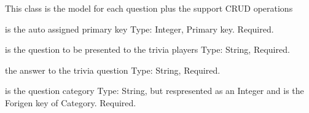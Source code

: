 \documentclass[letterpaper,10pt,english]{sphinxmanual}
\begin{document}
\begin{fulllineitems}
\label{\detokenize{index:models.Question}}
This class is the model for each question plus the support CRUD operations

\begin{fulllineitems}
\label{\detokenize{index:models.Question.id}}
 is the auto assigned primary key
Type: Integer, Primary key. Required.

\end{fulllineitems}


\begin{fulllineitems}
\label{\detokenize{index:models.Question.question}}
 is the question to be presented to the trivia players
Type: String, Required.

\end{fulllineitems}


\begin{fulllineitems}
\label{\detokenize{index:models.Question.answer}}
 the answer to the trivia question
Type: String, Required.

\end{fulllineitems}


\begin{fulllineitems}
\label{\detokenize{index:models.Question.category}}
 is the question category
Type: String, but respresented as an Integer and is the Forigen key of Category. Required.

\end{fulllineitems}


\end{fulllineitems}
\end{document}
